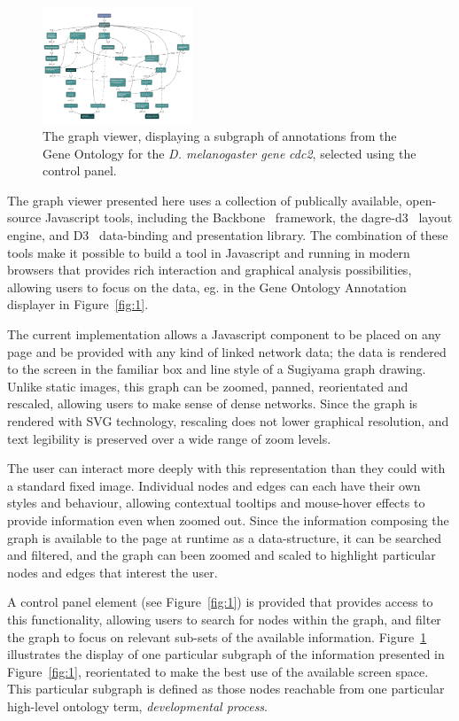 \documentclass[10pt,a4paper,twocolumn]{article}
\begin{document}
\begin{figure}[htb]
\centering
\includegraphics[width=0.4\textwidth]{dagify-subgraph.png}
\caption{
  \label{fig:2}
  The graph viewer, displaying a subgraph of annotations from the Gene Ontology
  for the \textit{D. melanogaster gene} \emph{cdc2}, selected using the control panel.
}
\end{figure}

The graph viewer presented here uses a collection of publically available,
open-source Javascript tools, including the Backbone~\cite{backbone} framework,
the dagre-d3~\cite{dagre-d3} layout engine, and D3~\cite{d3} data-binding and
presentation library. The combination of these tools make it possible to build a
tool in Javascript and running in modern browsers that provides rich interaction
and graphical analysis possibilities, allowing users to focus on the data, eg.
in the Gene Ontology Annotation displayer in Figure~\ref{fig:1}.

The current implementation allows a Javascript component to be placed on any
page and be provided with any kind of linked network data; the data is rendered
to the screen in the familiar box and line style of a Sugiyama graph drawing.
Unlike static images, this graph can be zoomed, panned, reorientated and
rescaled, allowing users to make sense of dense networks. Since the graph is
rendered with SVG technology, rescaling does not lower graphical resolution, and
text legibility is preserved over a wide range of zoom levels.

The user can interact more deeply with this representation than they could with
a standard fixed image. Individual nodes and edges can each have their own
styles and behaviour, allowing contextual tooltips and mouse-hover effects to
provide information even when zoomed out. Since the information composing the
graph is available to the page at runtime as a data-structure, it can be
searched and filtered, and the graph can been zoomed and scaled to highlight
particular nodes and edges that interest the user.

A control panel element (see Figure~\ref{fig:1}) is provided that provides
access to this functionality, allowing users to search for nodes within the
graph, and filter the graph to focus on relevant sub-sets of the available
information. Figure~\ref{fig:2} illustrates the display of one particular
subgraph of the information presented in Figure~\ref{fig:1}, reorientated to
make the best use of the available screen space. This particular subgraph is
defined as those nodes reachable from one particular high-level ontology term,
\emph{developmental process}.
\end{document}
